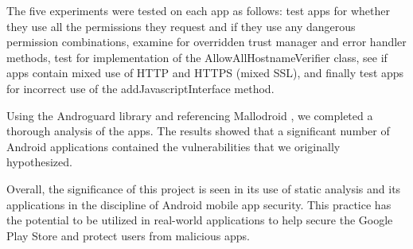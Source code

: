The five experiments were tested on each app as follows: test apps for whether they use all the permissions they request and if they use any dangerous permission combinations, examine for overridden trust manager and error handler methods, 
test for implementation of the AllowAllHostnameVerifier class, see if apps contain mixed use of HTTP and HTTPS (mixed SSL), and finally test apps for incorrect use of the addJavascriptInterface method.

Using the Androguard library \cite{androguard} and referencing Mallodroid \cite{10.1145/2382196.2382205}, we completed a thorough analysis of the apps. The results showed that a significant number of Android applications contained the vulnerabilities that we originally hypothesized.

Overall, the significance of this project is seen in its use of static analysis and its applications in the discipline of Android mobile app security. This practice has the potential to be utilized in real-world applications to help secure the Google Play Store and protect users from malicious apps. 
